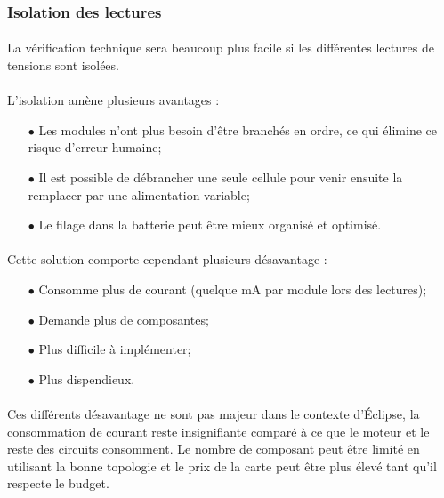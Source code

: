 	\newpage
	
	\subsubsection*{Isolation des lectures}
	\paragraph*{}
	La vérification technique sera beaucoup plus facile si les différentes lectures de tensions sont isolées. 
	
	\paragraph*{}
	L'isolation amène plusieurs avantages :
	\begin{itemize}
		\item[$\bullet$] Les modules n'ont plus besoin d'être branchés en ordre, ce qui élimine ce risque d'erreur humaine;
		\item[$\bullet$] Il est possible de débrancher une seule cellule pour venir ensuite la remplacer par une alimentation variable;
		\item[$\bullet$] Le filage dans la batterie peut être mieux organisé et optimisé.
	\end{itemize}

	\paragraph*{}
	Cette solution comporte cependant plusieurs désavantage :
	\begin{itemize}
		\item[$\bullet$] Consomme plus de courant (quelque mA par module lors des lectures);
		\item[$\bullet$] Demande plus de composantes;
		\item[$\bullet$] Plus difficile à implémenter;
		\item[$\bullet$] Plus dispendieux.
	\end{itemize}
	
	\paragraph*{}
	Ces différents désavantage ne sont pas majeur dans le contexte d'Éclipse, la consommation de courant reste insignifiante comparé à ce que le moteur et le reste des circuits consomment. Le nombre de composant peut être limité en utilisant la bonne topologie et le prix de la carte peut être plus élevé tant qu'il respecte le budget. 
	
